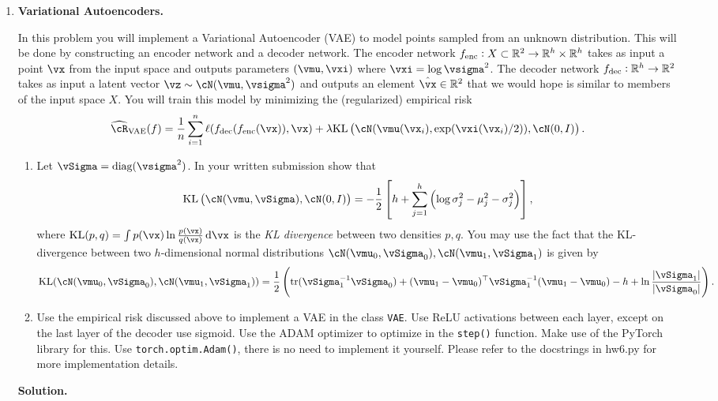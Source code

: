 \documentclass{article}
\def\hcR{\widehat{\cR}}
\DeclareMathOperator{\tr}{tr}
\theoremstyle{definition}
\theoremstyle{remark}
\newenvironment{Q}
                {%
                    \clearpage
                \item
                    }
                {%
                    \phantom{s}
                  \bigskip
                  \textbf{Solution.}
                }
\begin{document}
\begin{enumerate}
                     \begin{Q}
                      \textbf{Variational Autoencoders.}
                      
                      In this problem you will implement a Variational Autoencoder (VAE) to model points sampled from an unknown distribution.  This will be done by constructing an encoder network and a decoder network.  The encoder network $f_{\textup{enc}} : X \subset \mathbb{R}^2 \to \mathbb{R}^h \times \mathbb{R}^h$ takes as input a point $\vx$ from the input space and outputs parameters $(\vmu, \vxi)$ where $\vxi =  \log  \vsigma^2$. The decoder network $f_{\textup{dec}} : \mathbb{R}^h \to \mathbb{R}^2$ takes as input a latent vector $\vz \sim \cN(\vmu, \vsigma^2)$ and outputs an element $\hat{\vx} \in \mathbb{R}^2$ that we would hope is similar to members of the input space $X$. You will train this model by minimizing the (regularized) empirical risk
                      \begin{align*}
                     \hcR_{\textup{VAE}} (f) =  \frac{1}{n}\sum_{i=1}^n \ell ( f_{\textup{dec}}  (f_{\textup{enc}}(\vx)), \vx) + \lambda \textup{KL}\del{\cN(\vmu(\vx_i), \exp(\vxi(\vx_i)/2)), \cN(0, I)}.
                      \end{align*}
                      \begin{enumerate}
                    \item Let $\vSigma = \textup{diag}(\vsigma^2)$.  In your written submission show that
                    \begin{align*}
                    \textup{KL}\del{\cN(\vmu, \vSigma ), \cN(0,I)} = -\frac{1}{2} \sbr{ h + \sum_{j=1}^h\del{ \log \sigma^2_j - \mu_j^2 - \sigma_j^2 } },
                    \end{align*}
                    where $\textup{KL}(p,q) = \int p(\vx) \ln \frac {p(\vx)}{q(\vx)}\dif \vx$ is the \emph{KL divergence} between two densities $p,q$. You may use the fact that the KL-divergence between two $h$-dimensional normal distributions $\cN( \vmu_0, \vSigma_0), \cN ( \vmu_1, \vSigma_1 ) $ is given by
                    \begin{align*}
                    \textup{KL}(\cN( \vmu_0, \vSigma_0), \cN ( \vmu_1, \vSigma_1 )) = \frac{1}{2} \left( \tr( \vSigma_1^{-1} \vSigma_0) + (\vmu_1 - \vmu_0)^\top \vSigma_1^{-1}(\vmu_1 - \vmu_0) - h + \ln \frac{|\vSigma_1|}{|\vSigma_0|} \right) .
                    \end{align*}
                    \item Use the empirical risk discussed above to implement a VAE in the class \texttt{VAE}.  Use ReLU activations between each layer, except on the last layer of the decoder use sigmoid.  Use the ADAM optimizer to optimize in the \texttt{step()} function.  Make use of the PyTorch library for this. Use \texttt{torch.optim.Adam()}, there is no need to implement it yourself.  Please refer to the docstrings in hw6.py for more implementation details.

\end{enumerate}
\end{Q}
\end{enumerate}
\end{document}
